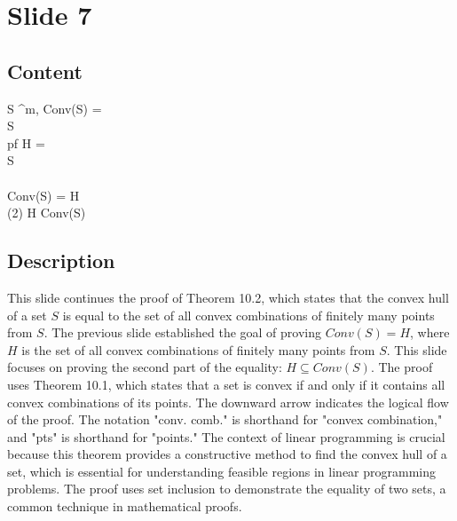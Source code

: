\documentclass{article}%
\begin{document}
\section{Slide 7}%
\label{sec:Slide7}%
\subsection{Content}%

\underline{} \quad S \subseteq {}^m, \quad Conv(S) =  \\
 S \\
pf \quad {} H =  \\
 S \\
\downarrow \\
 Conv(S) = H \\
(2) \quad H \subseteq Conv(S)
%
\subsection{Description}%
This slide continues the proof of Theorem 10.2, which states that the convex hull of a set $S$ is equal to the set of all convex combinations of finitely many points from $S$.  The previous slide established the goal of proving $Conv(S) = H$, where $H$ is the set of all convex combinations of finitely many points from $S$. This slide focuses on proving the second part of the equality: $H \subseteq Conv(S)$. The proof uses Theorem 10.1, which states that a set is convex if and only if it contains all convex combinations of its points.  The downward arrow indicates the logical flow of the proof.  The notation "conv. comb." is shorthand for "convex combination," and "pts" is shorthand for "points." The context of linear programming is crucial because this theorem provides a constructive method to find the convex hull of a set, which is essential for understanding feasible regions in linear programming problems. The proof uses set inclusion to demonstrate the equality of two sets, a common technique in mathematical proofs.%
\end{document}
